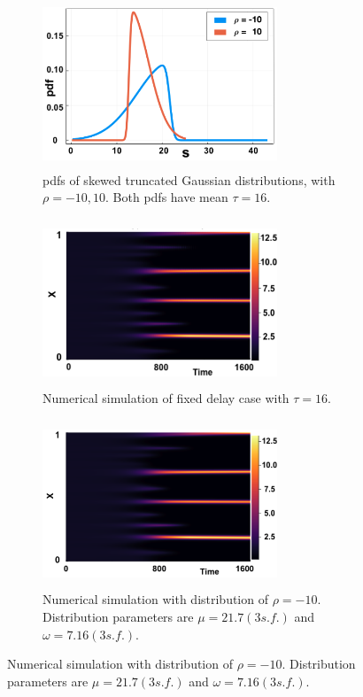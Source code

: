 \begin{figure}[H]
    \centering
    \begin{subfigure}[t]{0.45\textwidth}
        \centering
        \includegraphics[width=7cm,height=5cm]{dist16.png}
        \caption{pdfs of skewed truncated Gaussian distributions, with $\rho=-10,10$. Both pdfs have mean $\tau=16$.}
        \label{}
    \end{subfigure}
    \hfill
    \begin{subfigure}[t]{0.45\textwidth}
        \centering
        \includegraphics[width=7cm,height=5cm]{fixt16.png}
        \caption{Numerical simulation of fixed delay case with $\tau=16$.}
        \label{}
    \end{subfigure}
    \hfill
    \begin{subfigure}[t]{0.45\textwidth}
        \centering
        \includegraphics[width=7cm,height=5cm]{t16m10.png}
        \caption{Numerical simulation with distribution of $\rho=-10$. Distribution parameters are $\mu=21.7(3 s.f.)$ and $\omega=7.16(3 s.f.)$.}
        \label{}
    \end{subfigure}

\end{figure}
